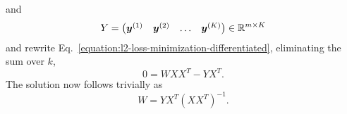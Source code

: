 %
and
%
\begin{equation}
    Y = \begin{pmatrix}
        \bm{y}^{(1)} & \bm{y}^{(2)} & \dots & \bm{y}^{(K)}
    \end{pmatrix} \in \mathbb{R}^{m \times K}
\end{equation}
%
and rewrite Eq.~\eqref{equation:l2-loss-minimization-differentiated}, eliminating the sum over $k$, 
%
\begin{equation}
    0 = W X X^T - Y X^T.
\end{equation}
%
The solution now follows trivially as
%
\begin{equation}
    W = Y X^T (X X^T)^{-1}.
\end{equation}
%
